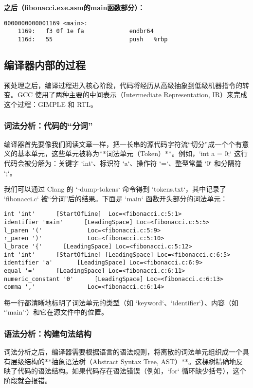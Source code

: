 \documentclass[a4paper]{article}
\begin{document}
\textbf{之后（fibonacci.exe.asm的main函数部分）：}
\begin{lstlisting}[language={[x86masm]Assembler}]
0000000000001169 <main>:
    1169:	f3 0f 1e fa          	endbr64
    116d:	55                   	push   %rbp
\end{lstlisting}

\subsection{编译器内部的过程}

预处理之后，编译过程进入核心阶段，代码将经历从高级抽象到低级机器指令的转变。GCC 使用了两种主要的中间表示（Intermediate Representation, IR）来完成这个过程：GIMPLE 和 RTL。

\subsubsection{词法分析：代码的“分词”}
编译器首先要像我们阅读文章一样，把一长串的源代码字符流“切分”成一个个有意义的基本单元，这些单元被称为**词法单元（Token）**。例如，`int a = 0;` 这行代码会被分解为：关键字 `int`、标识符 `a`、操作符 `=`、整型常量 `0` 和分隔符 `;`。

我们可以通过 Clang 的 `-dump-tokens` 命令得到 `tokens.txt`，其中记录了 `fibonacci.c` 被“分词”后的结果。下面是 `main` 函数开头部分的词法单元：
\begin{lstlisting}[language=text, caption={fibonacci.c 的部分词法单元 (tokens.txt)}]
int 'int'      [StartOfLine]  Loc=<fibonacci.c:5:1>
identifier 'main'      [LeadingSpace] Loc=<fibonacci.c:5:5>
l_paren '('             Loc=<fibonacci.c:5:9>
r_paren ')'             Loc=<fibonacci.c:5:10>
l_brace '{'      [LeadingSpace] Loc=<fibonacci.c:5:12>
int 'int'      [StartOfLine] [LeadingSpace] Loc=<fibonacci.c:6:5>
identifier 'a'       [LeadingSpace] Loc=<fibonacci.c:6:9>
equal '='      [LeadingSpace] Loc=<fibonacci.c:6:11>
numeric_constant '0'      [LeadingSpace] Loc=<fibonacci.c:6:13>
comma ','               Loc=<fibonacci.c:6:14>
\end{lstlisting}
每一行都清晰地标明了词法单元的类型（如 `keyword`、`identifier`）、内容（如 `'main'`）和它在源文件中的位置。

\subsubsection{语法分析：构建句法结构}
词法分析之后，编译器需要根据语言的语法规则，将离散的词法单元组织成一个具有层级结构的**抽象语法树（Abstract Syntax Tree, AST）**。这棵树精确地反映了代码的语法结构。如果代码存在语法错误（例如，`for` 循环缺少括号），这个阶段就会报错。
\end{document}
